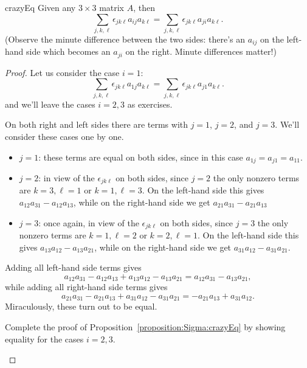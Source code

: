 \begin{prop}{crazyEq} Given any $3 \times 3$ matrix $A$, then 
\[ \sum_{j,k,\ell}\epsilon_{jk\ell} a_{ij}a_{k\ell} =  \sum_{j,k,\ell}\epsilon_{jk\ell} a_{ji}a_{k\ell}. \]
(Observe the minute difference between the two sides:  there's an $a_{ij}$ on the left-hand side which becomes an $a_{ji}$ on the right. Minute differences matter!)
\end{prop}
\begin{proof}
Let us consider the case $i=1$:
\[ \sum_{j,k,\ell}\epsilon_{jk\ell} a_{1j}a_{k\ell} =  \sum_{j,k,\ell}\epsilon_{jk\ell} a_{j1}a_{k\ell}. \]
 and we'll leave the cases $i=2,3$ as exercises.

On both right and left sides there are terms with $j=1$, $j=2$, and $j=3$.  We'll consider these cases one by one.
\begin{itemize}
\item
$j=1$: these terms are equal on both sides, since in this case $a_{1j}=a_{j1}=a_{11}$.
\item
$j=2$: in view of the $\epsilon_{jk\ell}$ on both sides, since $j=2$ the only nonzero terms are $k=3, \ell=1$  or $k=1, \ell = 3$.  On the left-hand side this gives $a_{12}a_{31} - a_{12}a_{13}$, while on the right-hand side we get $a_{21}a_{31} - a_{21}a_{13}$
\item
$j=3$: once again, in view of the $\epsilon_{jk\ell}$ on both sides, since $j=3$ the only nonzero terms are $k=1, \ell=2$  or $k=2, \ell = 1$.  On the left-hand side this gives $a_{13}a_{12} - a_{13}a_{21}$, while on the right-hand side we get $a_{31}a_{12} - a_{31}a_{21}$.
\end{itemize}
Adding all left-hand side terms gives
\[ a_{12}a_{31} - a_{12}a_{13} + a_{13}a_{12} - a_{13}a_{21} = a_{12}a_{31}  - a_{13}a_{21},\]
while adding all right-hand side terms gives
\[a_{21}a_{31} - a_{21}a_{13} + a_{31}a_{12} - a_{31}a_{21} = - a_{21}a_{13} + a_{31}a_{12}.\]
Miraculously, these turn out to be equal.

\begin{exercise}{} Complete the proof of Proposition~\ref{proposition:Sigma:crazyEq} by showing equality for the cases $i=2,3$.
\end{exercise}
\end{proof}

